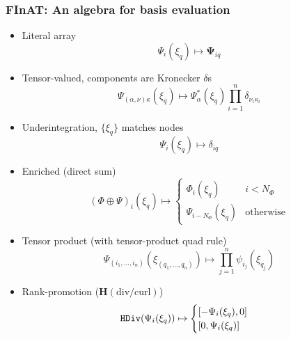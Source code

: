 \documentclass[presentation,aspectratio=43, 10pt]{beamer}
\begin{document}
\begin{frame}[fragile]
  \frametitle{FInAT: An algebra for basis evaluation}
  \footnotesize
  \begin{itemize}
  \item Literal array
    \begin{equation*}
      \Psi_i(\xi_q) \mapsto \bm{\Psi}_{iq}
    \end{equation*}
  \item Tensor-valued, components are Kronecker $\delta$s
    \begin{equation*}
      \Psi_{(\alpha, \nu)\kappa}(\xi_q) \mapsto \Psi_{\alpha}^*(\xi_q){\prod_{i=1}^n \delta_{\nu_i \kappa_i}}
    \end{equation*}
  \item Underintegration, $\{\xi_q\}$ matches nodes
    \begin{equation*}
      \Psi_i(\xi_q) \mapsto \delta_{iq}
    \end{equation*}
  \item Enriched (direct sum)
    \begin{equation*}
      {(\Phi \oplus \Psi)}_i(\xi_q) \mapsto
      \begin{cases}
        \Phi_i(\xi_q) &\text{$i < N_\Phi$}\\
        \Psi_{i-N_\Phi}(\xi_q) &\text{otherwise}
      \end{cases}
    \end{equation*}
  \item Tensor product (with tensor-product quad rule)
    \begin{equation*}
      \Psi_{(i_1, \dots, i_n)}(\xi_{(q_1, \dots, q_n)}) \mapsto \prod_{j=1}^{n} \psi_{i_j}(\xi_{q_j})
    \end{equation*}
  \item Rank-promotion ($\mathbf{H}(\text{div}/\text{curl})$)
    \begin{equation*}
      \text{\texttt{HDiv}}(\Psi_i(\xi_q)) \mapsto
      \begin{cases}
        [-\Psi_i(\xi_q), 0]\\
        [0, \Psi_i(\xi_q)]
      \end{cases}
    \end{equation*}
  \end{itemize}
\end{frame}
\end{document}
